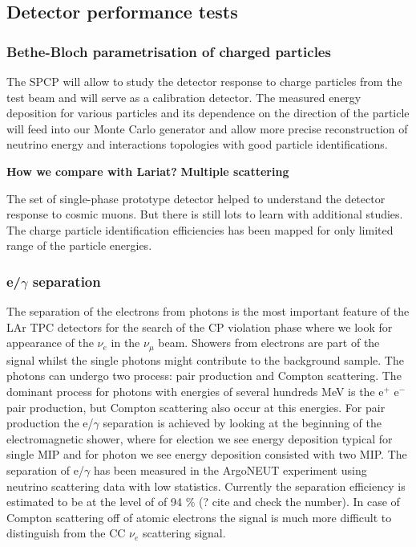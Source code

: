 \subsection{Detector performance tests}

\subsubsection{Bethe-Bloch parametrisation of charged particles}

The SPCP will allow to study the detector response to charge particles from the test beam and will serve as a calibration detector. The measured energy deposition for various particles and its dependence on the direction of the particle will feed into our Monte Carlo generator and allow more precise reconstruction of neutrino energy and interactions topologies with good particle identifications.
 
{\bf How we compare with Lariat?} 
{\bf Multiple scattering}  

The set of single-phase prototype detector helped to understand the detector response to cosmic muons. But there is still lots to learn with additional studies. 
The charge  particle identification efficiencies  has been mapped for only limited range of the particle energies.  

\subsubsection{e/$\gamma$ separation}

The separation of the electrons from photons is the most important feature of the LAr TPC detectors for the search of the CP violation phase where we look for appearance of the $\nu_e$ in the $\nu_\mu$ beam.  Showers from electrons are part of the signal whilst the single photons might contribute to the background sample. The photons can undergo two process: pair production and Compton scattering. The dominant process for photons with energies of several hundreds MeV  is the e$^+$ e$^-$ pair production, but Compton scattering also occur at this energies. For pair production the e/$\gamma$ separation is achieved by looking at the beginning of the electromagnetic shower, where for election we see energy deposition typical for single MIP and for photon we see energy deposition consisted with two MIP. The separation of e/$\gamma$ has been measured in the ArgoNEUT experiment using neutrino scattering data with low statistics. Currently the separation efficiency is estimated to be at the level of of 94 \% (? cite and check the number). In case of Compton scattering off of atomic electrons the signal is much more difficult to distinguish from the CC $\nu_e$ scattering signal.

